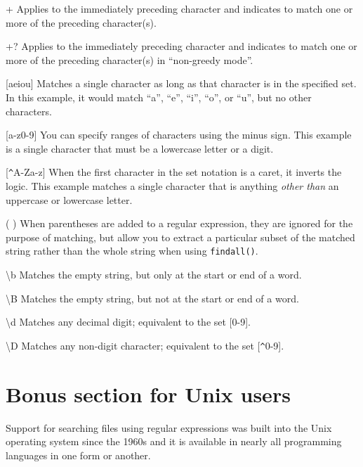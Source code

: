 + \newline
Applies to the immediately preceding character and indicates to match one or more of the
preceding character(s).

+? \newline
Applies to the immediately preceding character and indicates to match one or more of the
preceding character(s) in ``non-greedy mode''.

[aeiou] \newline
Matches a single character as long as that character is in the specified set.  In this example,
it would match ``a'', ``e'', ``i'', ``o'', or ``u'', but no other characters.

[a-z0-9] \newline
You can specify ranges of characters using the minus sign.  This example is a single character
that must be a lowercase letter or a digit.

[\verb"^"A-Za-z] \newline
When the first character in the set notation is a caret, it inverts the logic.  This example
matches a single character that is anything {\em other than} an uppercase or lowercase letter.

( ) \newline
When parentheses are added to a regular expression, they are ignored for the purpose of matching,
but allow you to extract a particular subset of the matched string rather than the whole string
when using {\tt findall()}.

{\textbackslash}b \newline
Matches the empty string, but only at the start or end of a word.

{\textbackslash}B \newline
Matches the empty string, but not at the start or end of a word.

{\textbackslash}d \newline
Matches any decimal digit; equivalent to the set [0-9].

{\textbackslash}D \newline
Matches any non-digit character; equivalent to the set [\verb"^"0-9].

\section{Bonus section for Unix users}

Support for searching files using regular expressions was built into the Unix operating system
since the 1960s and it is available in nearly all programming languages in one form or another.

